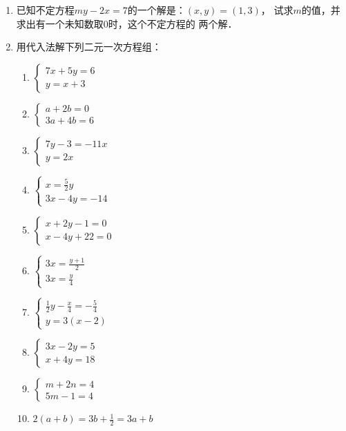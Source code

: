 \begin{enumerate}
\item 已知不定方程$my-2x=7$的一个解是：$(x,y)=(1,3)$，
试求$m$的值，并求出有一个未知数取0时，这个不定方程的
两个解．
\item 用代入法解下列二元一次方程组：
\begin{multicols}{2}
\begin{enumerate}
    \item $\begin{cases}
        7x+5y=6\\ y=x+3
    \end{cases}$
    \item $\begin{cases}
        a+2b=0\\ 3a+4b=6
    \end{cases}$
    \item $\begin{cases}
        7y-3=-11x\\ y=2x
    \end{cases}$
    \item $\begin{cases}
x=\frac{5}{2}y\\ 3x-4y=-14        
    \end{cases}$
    \item $\begin{cases}
        x+2y-1=0\\ x-4y+22=0
    \end{cases}$
    \item $\begin{cases}
        3x=\frac{y+1}{2}\\ 3x=\frac{y}{4}
    \end{cases}$
    \item $\begin{cases}
        \frac{1}{2}y-\frac{x}{4}=-\frac{5}{4}\\y=3(x-2)
    \end{cases}$
    \item $\begin{cases}
        3x-2y=5\\ x+4y=18
    \end{cases}$
    \item $\begin{cases}
        m+2n=4\\5m-1=4
    \end{cases}$
    \item $2(a+b)=3b+\frac{1}{2}=3a+b$
\end{enumerate}
\end{multicols}


\end{enumerate}
